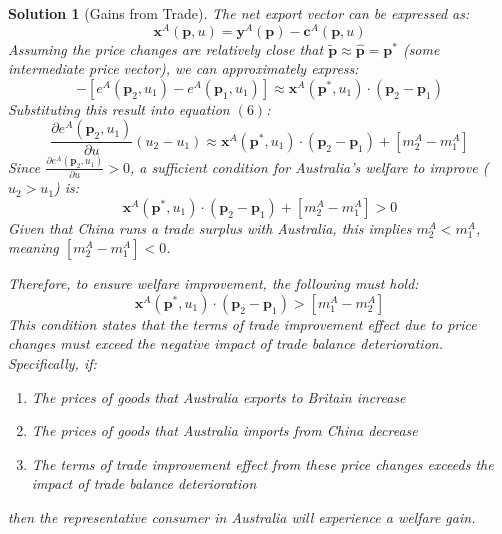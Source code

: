 \documentclass[a4paper,12pt]{article} %
\theoremstyle{nonitalic}
\newtheorem{solution}{Solution}
\begin{document}
\begin{solution}[Gains from Trade]
    The net export vector can be expressed as:
    \begin{equation}
        \mathbf{x}^A(\mathbf{p}, u) = \mathbf{y}^A(\mathbf{p}) - \mathbf{c}^A(\mathbf{p}, u) \tag{11}
    \end{equation}
    Assuming the price changes are relatively close that $\mathbf{\tilde{p}} \approx \mathbf{\hat{p}} = \mathbf{p}^*$ (some intermediate price vector), we can approximately express:
    \begin{equation}
        [r^A(\mathbf{p}_2) - r^A(\mathbf{p}_1)] - [e^A(\mathbf{p}_2, u_1) - e^A(\mathbf{p}_1, u_1)] \approx \mathbf{x}^A(\mathbf{p}^*, u_1) \cdot (\mathbf{p}_2 - \mathbf{p}_1) \tag{12}
    \end{equation}
    Substituting this result into equation $(6)$:
    \begin{equation}
        \frac{\partial e^A(\mathbf{p}_2, u_1)}{\partial u}(u_2 - u_1) \approx \mathbf{x}^A(\mathbf{p}^*, u_1) \cdot (\mathbf{p}_2 - \mathbf{p}_1) + [m^A_2 - m^A_1] \tag{13}
    \end{equation}
    Since $\frac{\partial e^A(\mathbf{p}_2, u_1)}{\partial u} > 0$, a sufficient condition for Australia's welfare to improve ($u_2 > u_1$) is:
    \begin{equation}
        \mathbf{x}^A(\mathbf{p}^*, u_1) \cdot (\mathbf{p}_2 - \mathbf{p}_1) + [m^A_2 - m^A_1] > 0 \tag{14}
    \end{equation}
    Given that China runs a trade surplus with Australia, this implies $m^A_2 < m^A_1$, meaning $[m^A_2 - m^A_1] < 0$.

    Therefore, to ensure welfare improvement, the following must hold:
    \begin{equation}
    \mathbf{x}^A(\mathbf{p}^*, u_1) \cdot (\mathbf{p}_2 - \mathbf{p}_1) > [m^A_1 - m^A_2] \tag{15}
    \end{equation}
    This condition states that the terms of trade improvement effect due to price changes must exceed the negative impact of trade balance deterioration.
    Specifically, if:
    \begin{enumerate}
        \item The prices of goods that Australia exports to Britain increase
        \item The prices of goods that Australia imports from China decrease
        \item The terms of trade improvement effect from these price changes exceeds the impact of trade balance deterioration
    \end{enumerate}
    then the representative consumer in Australia will experience a welfare gain.
\end{solution}
\end{document}
